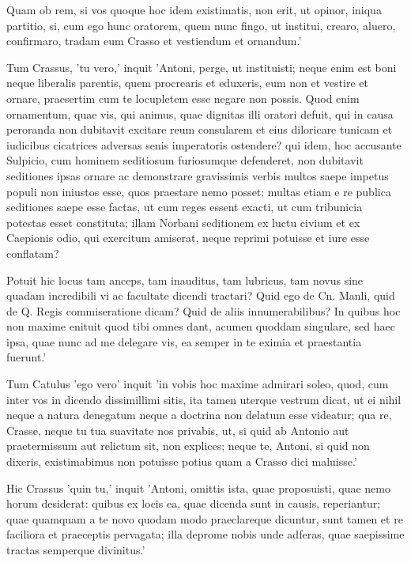  Quam ob rem, si vos quoque hoc idem existimatis, non erit, ut opinor, iniqua partitio, si, cum ego hunc oratorem, quem nunc fingo, ut institui, crearo, aluero, confirmaro, tradam eum Crasso et vestiendum et ornandum.'

 Tum Crassus, 'tu vero,' inquit 'Antoni, perge, ut instituisti; neque enim est boni neque liberalis parentis, quem procrearis et eduxeris, eum non et vestire et ornare, praesertim cum te locupletem esse negare non possis. Quod enim ornamentum, quae vis, qui animus, quae dignitas illi oratori defuit, qui in causa peroranda non dubitavit excitare reum consularem et eius diloricare tunicam et iudicibus cicatrices adversas senis imperatoris ostendere? qui idem, hoc accusante Sulpicio, cum hominem seditiosum furiosumque defenderet, non dubitavit seditiones ipsas ornare ac demonstrare gravissimis verbis multos saepe impetus populi non iniustos esse, quos praestare nemo posset; multas etiam e re publica seditiones saepe esse factas, ut cum reges essent exacti, ut cum tribunicia potestas esset constituta; illam Norbani seditionem ex luctu civium et ex Caepionis odio, qui exercitum amiserat, neque reprimi potuisse et iure esse conflatam?

 Potuit hic locus tam anceps, tam inauditus, tam lubricus, tam novus sine quadam incredibili vi ac facultate dicendi tractari? Quid ego de Cn. Manli, quid de Q. Regis commiseratione dicam? Quid de aliis innumerabilibus? In quibus hoc non maxime enituit quod tibi omnes dant, acumen quoddam singulare, sed haec ipsa, quae nunc ad me delegare vis, ea semper in te eximia et praestantia fuerunt.'

 Tum Catulus 'ego vero' inquit 'in vobis hoc maxime admirari soleo, quod, cum inter vos in dicendo dissimillimi sitis, ita tamen uterque vestrum dicat, ut ei nihil neque a natura denegatum neque a doctrina non delatum esse videatur; qua re, Crasse, neque tu tua suavitate nos privabis, ut, si quid ab Antonio aut praetermissum aut relictum sit, non explices; neque te, Antoni, si quid non dixeris, existimabimus non potuisse potius quam a Crasso dici maluisse.'

 Hic Crassus 'quin tu,' inquit 'Antoni, omittis ista, quae proposuisti, quae nemo horum desiderat: quibus ex locis ea, quae dicenda sunt in causis, reperiantur; quae quamquam a te novo quodam modo praeclareque dicuntur, sunt tamen et re faciliora et praeceptis pervagata; illa deprome nobis unde adferas, quae saepissime tractas semperque divinitus.'

